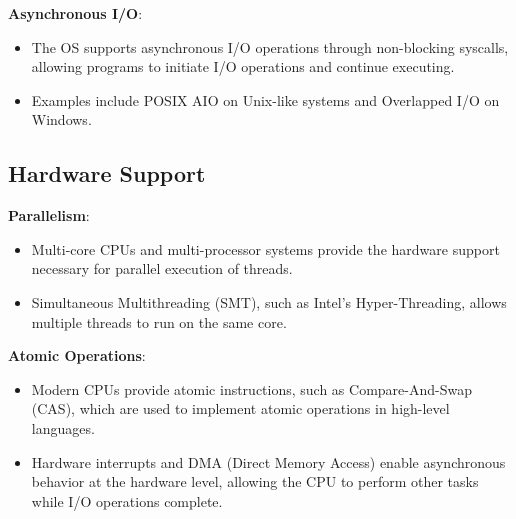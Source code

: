 \documentclass{article}
\begin{document}
\textbf{Asynchronous I/O}:
\begin{itemize}
    \item The OS supports asynchronous I/O operations through non-blocking syscalls, allowing programs to initiate I/O operations and continue executing.
    \item Examples include POSIX AIO on Unix-like systems and Overlapped I/O on Windows.
\end{itemize}

\subsection*{Hardware Support}
\textbf{Parallelism}:
\begin{itemize}
    \item Multi-core CPUs and multi-processor systems provide the hardware support necessary for parallel execution of threads.
    \item Simultaneous Multithreading (SMT), such as Intel's Hyper-Threading, allows multiple threads to run on the same core.
\end{itemize}

\textbf{Atomic Operations}:
\begin{itemize}
    \item Modern CPUs provide atomic instructions, such as Compare-And-Swap (CAS), which are used to implement atomic operations in high-level languages.
    \item Hardware interrupts and DMA (Direct Memory Access) enable asynchronous behavior at the hardware level, allowing the CPU to perform other tasks while I/O operations complete.
\end{itemize}
\end{document}

